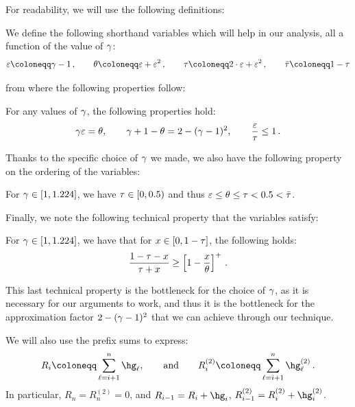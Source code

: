 For readability, we will use the following definitions:
\begin{definition}
    We define the following shorthand variables which will help in our analysis, all a function of the value of $\gamma$:
    \begin{align*}
        \Mcoeffmone \coloneqq \Mcoeff - 1\,,
        \qquad
        \MRttwo \coloneqq \Mcoeffmone + \Mcoeffmone^2\,,
        \qquad
        \Mtone \coloneqq 2\cdot \Mcoeffmone + \Mcoeffmone^2\,,
        \qquad
        \MRtone \coloneqq 1-\Mtone
    \end{align*}
\end{definition}
from where the following properties follow:
\begin{property}\label{property:coefficients}
    For any values of $\gamma$, the following properties hold:
    \begin{equation*}
        \gamma \varepsilon = \theta, \qquad \gamma + 1 - \theta = 2-(\gamma-1)^2, \qquad \frac{\varepsilon}{\tau} \leq 1\,.
    \end{equation*}
\end{property}
Thanks to the specific choice of $\gamma$ we made, we also have the following property on the ordering of the variables:
\begin{property}\label{property:thresholds}
    For $\gamma \in [1,1.224]$, we have $\tau \in [0,0.5)$ and thus $\varepsilon \leq \theta \leq \tau < 0.5 < \bar\tau$.
\end{property}
Finally, we note the following technical property that the variables satisfy:
\begin{property}\label{property:function-tau}
    For $\gamma \in [1,1.224]$, we have that for $x\in[0,1-\tau]$, the following holds:
    \begin{equation*}    
        \frac{1-\tau-x}{\tau + x} \geq \left[1-\frac{x}{\theta}\right]^+\,.
    \end{equation*}
\end{property}

This last technical property is the bottleneck for the choice of $\gamma$, as it is necessary for our arguments to work, and thus it is the bottleneck for the approximation factor $2-(\gamma-1)^2$ that we can achieve through our technique.

We will also use the prefix sums to express:
\begin{equation*}
    R_i \coloneqq \sum_{\ell=i+1}^n \hg_\ell, \qquad\text{and}\qquad R_i^{(2)} \coloneqq \sum_{\ell=i+1}^n \hg_\ell^{(2)}\,.
\end{equation*}
In particular, $R_n=R_n^{(2)}=0$, and $R_{i-1}=R_i+\hg_i$, $R_{i-1}^{(2)}=R_i^{(2)}+\hg_i^{(2)}$.

